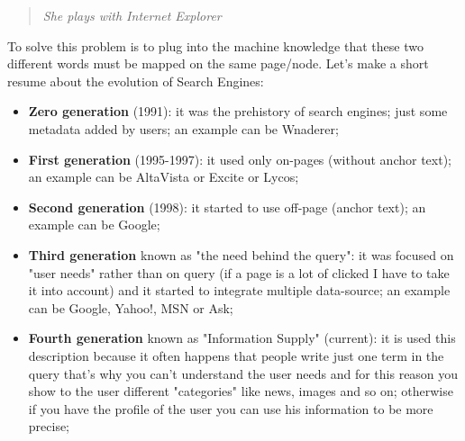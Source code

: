 \begin{quote}
    \centering \textit{She plays with Internet Explorer}
\end{quote}
To solve this problem is to plug into the machine knowledge that these two different words must be mapped on the same page/node.\newline
Let's make a short resume about the evolution of Search Engines:
\begin{itemize}
    \item \textbf{Zero generation} (1991): it was the prehistory of search engines; just some metadata added by users; an example can be Wnaderer;
    \item \textbf{First generation} (1995-1997):  it used only on-pages (without anchor text); an example can be AltaVista or Excite or Lycos;
    \item \textbf{Second generation} (1998): it started to use off-page (anchor text); an example can be Google;
    \item \textbf{Third generation} known as "the need behind the query": it was focused on "user needs" rather than on query (if a page is a lot of clicked I have to take it into account) and it started to integrate multiple data-source; an example can be Google, Yahoo!, MSN or Ask; 
    \item \textbf{Fourth generation} known as "Information Supply" (current): it is used this description because it often happens that people write just one term in the query that's why you can't understand the user needs and for this reason you show to the user different "categories" like news, images and so on; otherwise if you have the profile of the user you can use his information to be more precise;
\end{itemize}
